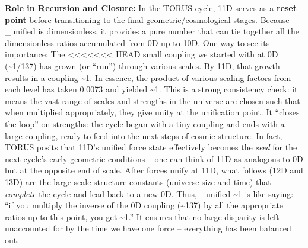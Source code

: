 \documentclass[]{article}
\begin{document}
\textbf{Role in Recursion and Closure:} In the TORUS cycle, 11D serves
as a \textbf{reset point} before transitioning to the final
geometric/cosmological stages. Because \alpha\_unified is dimensionless, it
provides a pure number that can tie together all the dimensionless
ratios accumulated from 0D up to 10D. One way to see its importance: The
<<<<<<< HEAD
small coupling we started with at 0D (\alpha \textasciitilde1/137) has grown
(or ``run'') through various scales. By 11D, that growth results in a
coupling \textasciitilde1. In essence, the product of various scaling
factors from each level has taken 0.0073 and yielded
\textasciitilde1\hspace{0pt}. This is a strong consistency check: it
means the vast range of scales and strengths in the universe are chosen
such that when multiplied appropriately, they give unity at the
unification point. It ``closes the loop'' on strengths: the cycle began
with a tiny coupling and ends with a large coupling, ready to feed into
the next steps of cosmic structure\hspace{0pt}. In fact, TORUS posits
that 11D's unified force state effectively becomes the \emph{seed} for
the next cycle's early geometric conditions -- one can think of 11D as
analogous to 0D but at the opposite end of scale\hspace{0pt}. After
forces unify at 11D, what follows (12D and 13D) are the large-scale
structure constants (universe size and time) that \emph{complete} the
cycle and lead back to a new 0D. Thus, \alpha\_unified \textasciitilde1 is
like saying: ``if you multiply the inverse of the 0D coupling
(\textasciitilde137) by all the appropriate ratios up to this point, you
get \textasciitilde1.'' It ensures that no large disparity is left
unaccounted for by the time we have one force -- everything has been
balanced out.
\end{document}
